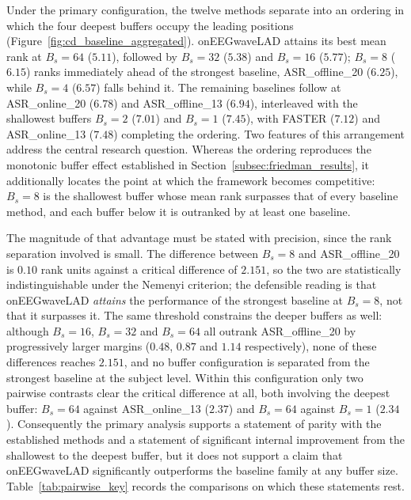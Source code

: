 \documentclass[MScCS,12pt,oneside,final]{uccthesis}
\begin{document}
Under the primary configuration, the twelve methods separate into an ordering in which the four deepest buffers occupy the leading positions (Figure~\ref{fig:cd_baseline_aggregated}). onEEGwaveLAD attains its best mean rank at $B_s = 64$ ($5.11$), followed by $B_s = 32$ ($5.38$) and $B_s = 16$ ($5.77$); $B_s = 8$ ($6.15$) ranks immediately ahead of the strongest baseline, ASR\_offline\_20 ($6.25$), while $B_s = 4$ ($6.57$) falls behind it. The remaining baselines follow at ASR\_online\_20 ($6.78$) and ASR\_offline\_13 ($6.94$), interleaved with the shallowest buffers $B_s = 2$ ($7.01$) and $B_s = 1$ ($7.45$), with FASTER ($7.12$) and ASR\_online\_13 ($7.48$) completing the ordering. Two features of this arrangement address the central research question. Whereas the ordering reproduces the monotonic buffer effect established in Section~\ref{subsec:friedman_results}, it additionally locates the point at which the framework becomes competitive: $B_s = 8$ is the shallowest buffer whose mean rank surpasses that of every baseline method, and each buffer below it is outranked by at least one baseline.

The magnitude of that advantage must be stated with precision, since the rank separation involved is small. The difference between $B_s = 8$ and ASR\_offline\_20 is $0.10$ rank units against a critical difference of $2.151$, so the two are statistically indistinguishable under the Nemenyi criterion; the defensible reading is that onEEGwaveLAD \emph{attains} the performance of the strongest baseline at $B_s = 8$, not that it surpasses it. The same threshold constrains the deeper buffers as well: although $B_s = 16$, $B_s = 32$ and $B_s = 64$ all outrank ASR\_offline\_20 by progressively larger margins ($0.48$, $0.87$ and $1.14$ respectively), none of these differences reaches $2.151$, and no buffer configuration is separated from the strongest baseline at the subject level. Within this configuration only two pairwise contrasts clear the critical difference at all, both involving the deepest buffer: $B_s = 64$ against ASR\_online\_13 ($2.37$) and $B_s = 64$ against $B_s = 1$ ($2.34$). Consequently the primary analysis supports a statement of parity with the established methods and a statement of significant internal improvement from the shallowest to the deepest buffer, but it does not support a claim that onEEGwaveLAD significantly outperforms the baseline
family at any buffer size. Table~\ref{tab:pairwise_key} records the comparisons on which these statements rest.
\end{document}
